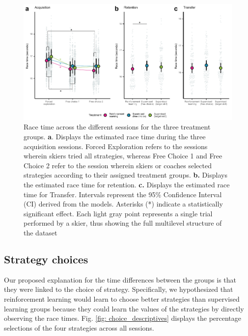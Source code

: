 \documentclass[pdflatex,sn-mathphys-num]{sn-jnl}%
\theoremstyle{thmstyleone}%
\theoremstyle{thmstyletwo}%
\theoremstyle{thmstylethree}%
\begin{document}
\begin{figure}[H]
\centering
\includegraphics{figures/figure_racingtimes_2.pdf}
\caption{Race time across the different sessions for the three treatment groups. \textbf{a}. Displays the estimated race time during the three acquisition sessions. Forced Exploration refers to the sessions wherein skiers tried all strategies, whereas Free Choice 1 and Free Choice 2 refer to the session wherein skiers or coaches selected strategies according to their assigned treatment groups. \textbf{b.} Displays the estimated race time for retention. \textbf{c.} Displays the estimated race time for Transfer. Intervals represent the 95\% Confidence Interval (CI) derived from the models. Asterisks (*) indicate a statistically significant effect. Each light gray point represents a single trial performed by a skier, thus showing the full multilevel structure of the dataset}
\label{fig: racetime}
\end{figure}





\subsection{Strategy choices}\label{result_strategychoice}
Our proposed explanation for the time differences between the groups is that they were linked to the choice of strategy. Specifically, we hypothesized that reinforcement learning would learn to choose better strategies than supervised learning groups because they could learn the values of the strategies by directly observing the race times. Fig. \ref{fig: choice_descriptives} displays the percentage selections of the four strategies across all sessions.
\end{document}
